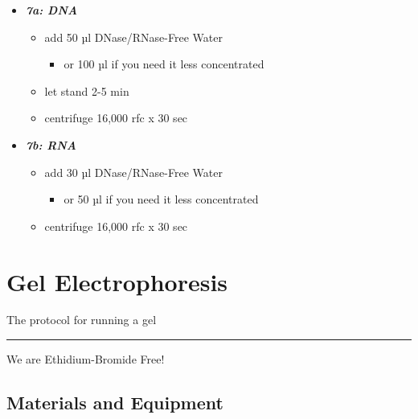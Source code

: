 \documentclass[
  letterpaper,
  DIV=11,
  numbers=noendperiod]{scrreprt}
\providecommand{\tightlist}{%
  \setlength{\itemsep}{0pt}\setlength{\parskip}{0pt}}\usepackage{longtable,booktabs,array}
\begin{document}
\begin{enumerate}
  \begin{itemize}
  \item
    \textbf{\emph{7a: DNA}}

    \begin{itemize}
    \item
      add 50 µl DNase/RNase-Free Water

      \begin{itemize}
      \tightlist
      \item
        or 100 µl if you need it less concentrated
      \end{itemize}
    \item
      let stand 2-5 min
    \item
      centrifuge 16,000 rfc x 30 sec
    \end{itemize}
  \item
    \textbf{\emph{7b: RNA}}

    \begin{itemize}
    \item
      add 30 µl DNase/RNase-Free Water

      \begin{itemize}
      \tightlist
      \item
        or 50 µl if you need it less concentrated
      \end{itemize}
    \item
      centrifuge 16,000 rfc x 30 sec
    \end{itemize}
  \end{itemize}
\end{enumerate}

\hypertarget{gel-electrophoresis}{%
\chapter{Gel Electrophoresis}\label{gel-electrophoresis}}

The protocol for running a gel

\begin{center}\rule{0.5\linewidth}{0.5pt}\end{center}

We are Ethidium-Bromide Free!

\hypertarget{materials-and-equipment-2}{%
\section*{\texorpdfstring{\textbf{Materials and
Equipment}}{Materials and Equipment}}\label{materials-and-equipment-2}}
\end{document}
